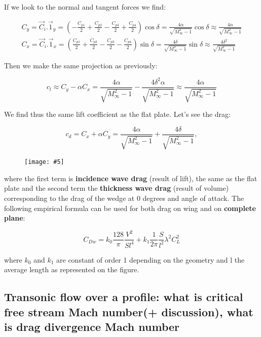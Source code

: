 \documentclass[british,french,11pt, a4paper, openany]{article}
\newcommand{\wrapfig}[6]{%
	\begin{figure}%
		\vspace{-5mm}%
		\texttt{[image: \#5]}%
		\captionof{figure}{}%
		\label{#6}%
	\end{figure}%
}
\begin{document}
If we look to the normal and tangent forces we find: 

\begin{equation}
\begin{aligned}
C_y = \vec{C}_i .\vec{1}_y = \left(-\frac{C_{p1}}{2} + \frac{C_{p2}}{2} -\frac{C_{p3}}{2} +\frac{C_{p4}}{2} \right) \cos \delta= \frac{4\alpha }{\sqrt{M_\infty ^2 -1}} \cos \delta \approx \frac{4\alpha }{\sqrt{M_\infty ^2 -1}}\\
C_x = \vec{C}_i .\vec{1}_x = \left(\frac{C_{p1}}{2} + \frac{C_{p2}}{2} -\frac{C_{p3}}{2} -\frac{C_{p4}}{2} \right) \sin \delta = \frac{4\delta }{\sqrt{M_\infty ^2 -1}} \sin \delta \approx \frac{4\delta ^2}{\sqrt{M_\infty ^2 -1}}
\end{aligned}
\end{equation}

Then we make the same projection as previously: 

\begin{equation}
c_l \approx C_y - \alpha C_x = \frac{4\alpha }{\sqrt{M_\infty ^2 -1}} - \frac{4\delta ^2\alpha }{\sqrt{M_\infty ^2 -1}}  \approx \frac{4\alpha }{\sqrt{M_\infty ^2 -1}} 
\end{equation}

We find thus the same lift coefficient as the flat plate. Let's see the drag: 

\begin{equation}
c_d = C_x + \alpha C_y = \frac{4\alpha }{\sqrt{M_\infty ^2 -1}} + \frac{4\delta}{\sqrt{M_\infty ^2 -1}},
\end{equation}

\wrapfig{11}{l}{3}{0.3}{ch6/20}{fig:6.20}
where the first term is \textbf{incidence wave drag} (result of lift), the same as the flat plate and the second term the \textbf{thickness wave drag} (result of volume) corresponding to the drag of the wedge at 0 degrees and angle of attack. The following empirical formula can be used for both drag on wing and on \textbf{complete plane}: 

\begin{equation}
C_{Dw} = k_0 \frac{128}{\pi} \frac{V^2}{Sl^4} + k_1 \frac{1}{2\pi} \frac{S}{l^2}\lambda ^2 C_L^2
\end{equation}

where $k_0$ and $k_1$ are constant of order 1 depending on the geometry and l the average length as represented on the figure. 

\subsection{Transonic flow over a profile: what is critical free stream Mach number(+ discussion), what is drag divergence Mach number}
\end{document}
